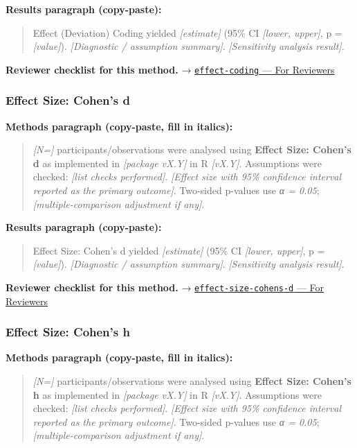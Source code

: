 \documentclass[
]{article}
\begin{document}
\textbf{Results paragraph (copy-paste):}

\begin{quote}
Effect (Deviation) Coding yielded \emph{{[}estimate{]}} (95\% CI
\emph{{[}lower, upper{]}}, p = \emph{{[}value{]}}). \emph{{[}Diagnostic
/ assumption summary{]}}. \emph{{[}Sensitivity analysis result{]}}.
\end{quote}

\textbf{Reviewer checklist for this method.} →
\href{../chapters/07-regression/effect-coding.Rmd\#for-reviewers}{\texttt{effect-coding}
--- For Reviewers}

\subsubsection{Effect Size: Cohen's d}\label{effect-size-cohens-d}

\textbf{Methods paragraph (copy-paste, fill in italics):}

\begin{quote}
\emph{{[}N={]}} participants/observations were analysed using
\textbf{Effect Size: Cohen's d} as implemented in \emph{{[}package
vX.Y{]}} in R \emph{{[}vX.Y{]}}. Assumptions were checked: \emph{{[}list
checks performed{]}}. \emph{{[}Effect size with 95\% confidence interval
reported as the primary outcome{]}}. Two-sided p-values use \emph{α =
0.05}; \emph{{[}multiple-comparison adjustment if any{]}}.
\end{quote}

\textbf{Results paragraph (copy-paste):}

\begin{quote}
Effect Size: Cohen's d yielded \emph{{[}estimate{]}} (95\% CI
\emph{{[}lower, upper{]}}, p = \emph{{[}value{]}}). \emph{{[}Diagnostic
/ assumption summary{]}}. \emph{{[}Sensitivity analysis result{]}}.
\end{quote}

\textbf{Reviewer checklist for this method.} →
\href{../chapters/05-power/effect-size-cohens-d.Rmd\#for-reviewers}{\texttt{effect-size-cohens-d}
--- For Reviewers}

\subsubsection{Effect Size: Cohen's h}\label{effect-size-cohens-h}

\textbf{Methods paragraph (copy-paste, fill in italics):}

\begin{quote}
\emph{{[}N={]}} participants/observations were analysed using
\textbf{Effect Size: Cohen's h} as implemented in \emph{{[}package
vX.Y{]}} in R \emph{{[}vX.Y{]}}. Assumptions were checked: \emph{{[}list
checks performed{]}}. \emph{{[}Effect size with 95\% confidence interval
reported as the primary outcome{]}}. Two-sided p-values use \emph{α =
0.05}; \emph{{[}multiple-comparison adjustment if any{]}}.
\end{quote}
\end{document}
